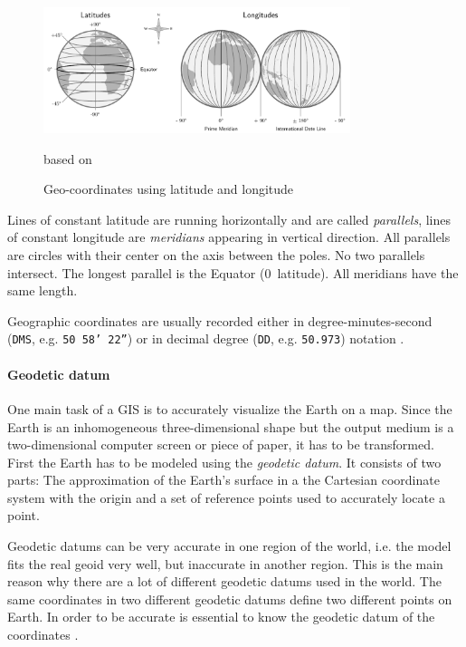 \begin{figure}[ht]
  \vspace{1em}
  \centering
  \includegraphics[width=0.8\textwidth]{graphics/basics/geo-coordinates}
  \caption{Geo-coordinates using latitude and longitude}
  \small{based on \cite[pp. 26-28]{bolstad2008gis}}
  \label{fig:geo-coordinates}
\end{figure}

Lines of constant latitude are running horizontally and are called \emph{parallels}, lines of constant longitude are \emph{meridians} appearing in vertical direction. All parallels are circles with their center on the axis between the poles. No two parallels intersect. The longest parallel is the Equator (0\degree~latitude). All meridians have the same length.

Geographic coordinates are usually recorded either in degree-minutes-second (\texttt{DMS}, e.g. \texttt{50\degree~58' 22''}) or in decimal degree (\texttt{DD}, e.g. \texttt{50.973}) notation
\cite[pp. 30, 79]{bolstad2008gis}.


\paragraph{Geodetic datum} %
\label{par:geodetic_datum}

One main task of a GIS is to accurately visualize the Earth on a map. Since the Earth is an inhomogeneous three-dimensional shape but the output medium is a two-dimensional computer screen or piece of paper, it has to be transformed. First the Earth has to be modeled using the \emph{geodetic datum}. It consists of two parts: The approximation of the Earth's surface in a the Cartesian coordinate system with the origin and a set of reference points used to accurately locate a point.

Geodetic datums can be very accurate in one region of the world, i.e. the model fits the real geoid very well, but inaccurate in another region. This is the main reason why there are a lot of different geodetic datums used in the world. The same coordinates in two different geodetic datums define two different points on Earth. In order to be accurate is essential to know the geodetic datum of the coordinates
\cite[p. 80]{bolstad2008gis}.

